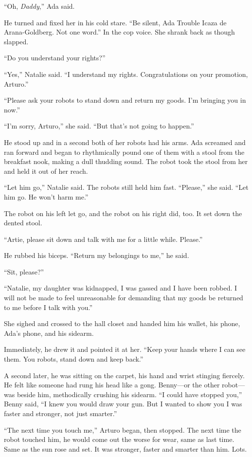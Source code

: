 “Oh, \emph{Daddy},” Ada said.

He turned and fixed her in his cold stare. “Be silent, Ada Trouble
Icaza de Arana-Goldberg. Not one word.” In the cop voice. She
shrank back as though slapped.

“Do you understand your rights?”

“Yes,” Natalie said. “I understand my rights. Congratulations on
your promotion, Arturo.”

“Please ask your robots to stand down and return my goods. I’m
bringing you in now.”

“I’m sorry, Arturo,” she said. “But that’s not going to happen.”

He stood up and in a second both of her robots had his arms. Ada
screamed and ran forward and began to rhythmically pound one of
them with a stool from the breakfast nook, making a dull thudding
sound. The robot took the stool from her and held it out of her
reach.

“Let him go,” Natalie said. The robots still held him fast.
“Please,” she said. “Let him go. He won’t harm me.”

The robot on his left let go, and the robot on his right did, too.
It set down the dented stool.

“Artie, please sit down and talk with me for a little while.
Please.”

He rubbed his biceps. “Return my belongings to me,” he said.

“Sit, please?”

“Natalie, my daughter was kidnapped, I was gassed and I have been
robbed. I will not be made to feel unreasonable for demanding that
my goods be returned to me before I talk with you.”

She sighed and crossed to the hall closet and handed him his
wallet, his phone, Ada’s phone, and his sidearm.

Immediately, he drew it and pointed it at her. “Keep your hands
where I can see them. You robots, stand down and keep back.”

A second later, he was sitting on the carpet, his hand and wrist
stinging fiercely. He felt like someone had rung his head like a
gong. Benny—or the other robot—was beside him, methodically
crushing his sidearm. “I could have stopped you,” Benny said, “I
knew you would draw your gun. But I wanted to show you I was faster
and stronger, not just smarter.”

“The next time you touch me,” Arturo began, then stopped. The next
time the robot touched him, he would come out the worse for wear,
same as last time. Same as the sun rose and set. It was stronger,
faster and smarter than him. Lots.

